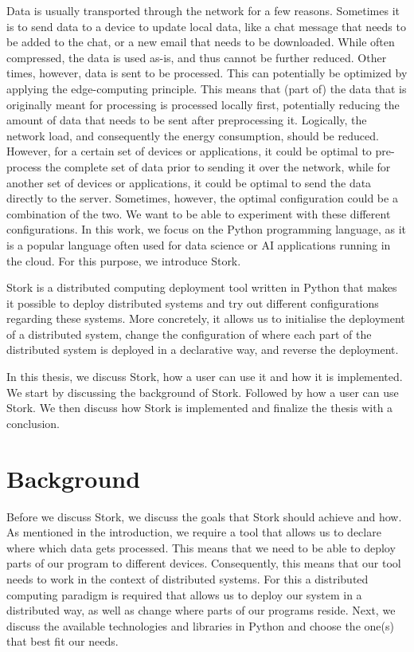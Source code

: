 \documentclass[a4paper]{article}
\begin{document}
Data is usually transported through the network for a few reasons. Sometimes it is to send data to a device to update local data, like a chat message that needs to be added to the chat, or a new email that needs to be downloaded. While often compressed, the data is used as-is, and thus cannot be further reduced. Other times, however, data is sent to be processed. This can potentially be optimized by applying the edge-computing principle. This means that (part of) the data that is originally meant for processing is processed locally first, potentially reducing the amount of data that needs to be sent after preprocessing it. Logically, the network load, and consequently the energy consumption, should be reduced. However, for a certain set of devices or applications, it could be optimal to pre-process the complete set of data prior to sending it over the network, while for another set of devices or applications, it could be optimal to send the data directly to the server. Sometimes, however, the optimal configuration could be a combination of the two. We want to be able to experiment with these different configurations. In this work, we focus on the Python programming language, as it is a popular language often used for data science or AI applications running in the cloud. For this purpose, we introduce Stork.

Stork is a distributed computing deployment tool written in Python that makes it possible to deploy distributed systems and try out different configurations regarding these systems. More concretely, it allows us to initialise the deployment of a distributed system, change the configuration of where each part of the distributed system is deployed in a declarative way, and reverse the deployment.

In this thesis, we discuss Stork, how a user can use it and how it is implemented. We start by discussing the background of Stork. Followed by how a user can use Stork. We then discuss how Stork is implemented and finalize the thesis with a conclusion.
\section{Background}
Before we discuss Stork, we discuss the goals that Stork should achieve and how. As mentioned in the introduction, we require a tool that allows us to declare where which data gets processed. This means that we need to be able to deploy parts of our program to different devices. Consequently, this means that our tool needs to work in the context of distributed systems. For this a distributed computing paradigm is required that allows us to deploy our system in a distributed way, as well as change where parts of our programs reside. Next, we discuss the available technologies and libraries in Python and choose the one(s) that best fit our needs.
\end{document}
